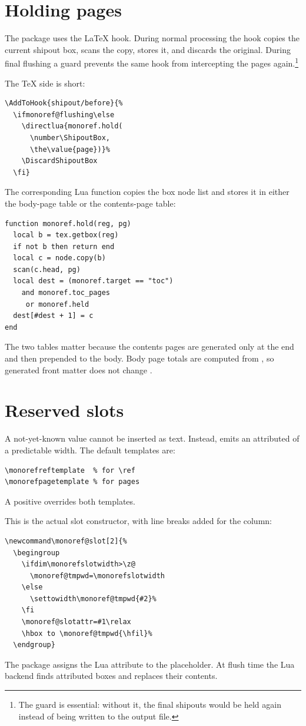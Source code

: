\documentclass{ltugboat}
\begin{document}
\section{Holding pages}

The package uses the \LaTeX{}  hook.  During
normal processing the hook copies the current shipout box, scans the
copy, stores it, and discards the original.  During final flushing a
guard prevents the same hook from intercepting the pages again.\footnote{The
guard is essential: without it, the final shipouts would be held again
instead of being written to the output file.}

The TeX side is short:
\begin{lstlisting}[style=monoreftex]
\AddToHook{shipout/before}{%
  \ifmonoref@flushing\else
    \directlua{monoref.hold(
      \number\ShipoutBox,
      \the\value{page})}%
    \DiscardShipoutBox
  \fi}
\end{lstlisting}
The corresponding Lua function copies the box node list and stores it
in either the body-page table or the contents-page table:
\begin{lstlisting}[style=monoreflua]
function monoref.hold(reg, pg)
  local b = tex.getbox(reg)
  if not b then return end
  local c = node.copy(b)
  scan(c.head, pg)
  local dest = (monoref.target == "toc")
    and monoref.toc_pages
     or monoref.held
  dest[#dest + 1] = c
end
\end{lstlisting}
The two tables matter because the contents pages are generated only at
the end and then prepended to the body.  Body page totals are computed
from , so generated front matter does not change
.

\section{Reserved slots}

A not-yet-known value cannot be inserted as text.  Instead,
 emits an attributed  of a predictable width.
The default templates are:
\begin{lstlisting}[style=monoreftex]
\monorefreftemplate  % for \ref
\monorefpagetemplate % for pages
\end{lstlisting}
A positive  overrides both templates.

This is the actual slot constructor, with line breaks added for the
column:
\begin{lstlisting}[style=monoreftex]
\newcommand\monoref@slot[2]{%
  \begingroup
    \ifdim\monorefslotwidth>\z@
      \monoref@tmpwd=\monorefslotwidth
    \else
      \settowidth\monoref@tmpwd{#2}%
    \fi
    \monoref@slotattr=#1\relax
    \hbox to \monoref@tmpwd{\hfil}%
  \endgroup}
\end{lstlisting}
The package assigns the  Lua attribute to the
placeholder.  At flush time the Lua backend finds attributed boxes and
replaces their contents.
\end{document}
